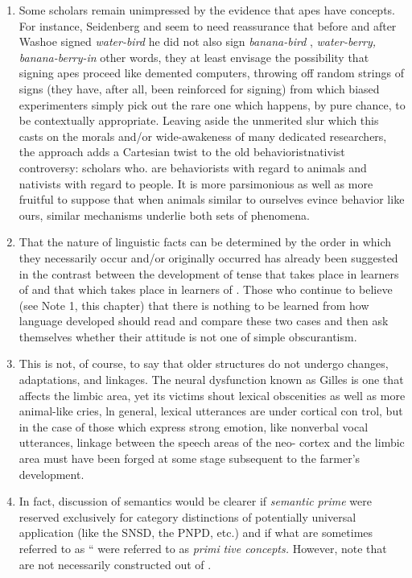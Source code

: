\begin{enumerate}
\item Some scholars remain unimpressed by the evidence that apes have concepts. For instance, Seidenberg and \citet{Petitto1979} seem to
need reassurance that before and after Washoe signed \textit{water-bird} he did not also sign \textit{banana-bird} , \textit{water-berry,} \textit{banana-berry-in} other words, they at least envisage the possibility that signing apes proceed like
demented computers, throwing off random strings of signs (they have, after all, been reinforced for signing) from which biased experimenters simply pick out the rare one which happens, by pure chance, to be contextually appropriate. Leaving aside the unmerited slur which this casts on the morals and/or wide-awakeness of many dedicated re\-searchers, the approach adds a Cartesian twist to the old behaviorist\-nativist controversy: scholars who. are behaviorists with regard to animals and nativists with regard to people. It is more parsimonious as well as more fruitful to suppose that when animals similar to our\-selves evince behavior like ours, similar mechanisms underlie both sets of phenomena. 
\item That the nature of linguistic facts can be determined by the order in which they necessarily occur and/or originally occurred has already been suggested in the contrast between the development of tense that takes place in learners of  and that which takes place in learners of . Those who continue to believe (see Note 1, this chapter) that there is nothing to be learned from  how language developed should read and compare these two cases and then ask themselves whether their attitude is not one of simple obscurantism.
\item This is not, of course, to say that older structures do not undergo changes, adaptations, and linkages. The neural dysfunction known as Gilles  is one that affects the limbic area, yet its victims shout lexical obscenities as well as more animal-like cries, ln general, lexical utterances are under cortical con trol, but in the case of those which express strong emotion, like non\-verbal vocal utterances, linkage between the speech areas of the neo- cortex and the limbic area must have been forged at some stage sub\-sequent to the farmer's development.
\item In fact, discussion of semantics would be clearer if \textit{semantic} \textit{prime} were reserved exclusively for category distinctions of potentially universal application (like the SNSD, the PNPD, etc.) and if what are sometimes referred to as `` were referred to as \textit{primi\-} \textit{tive concepts.} However, note that  are not necessarily constructed out of . 

\end{enumerate}

